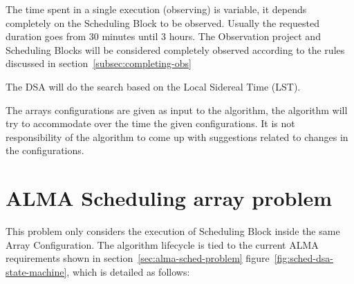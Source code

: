 The time spent in a single execution (observing) is variable, it depends completely on the Scheduling Block to be observed. Usually the requested duration goes from 30 minutes until 3 hours. The Observation project and Scheduling Blocks will be considered completely observed according to the rules discussed in section~\ref{subsec:completing-obs} 

The DSA will do the search based on the Local Sidereal Time (LST).

The arrays configurations are given as input to the algorithm, the algorithm will try to accommodate over the time the given configurations. It is not responsibility of the algorithm to come up with suggestions related to changes in the configurations.
 
\section{ALMA Scheduling array problem}

This problem only considers the execution of Scheduling Block inside the same Array Configuration. The algorithm lifecycle is tied to the current ALMA requirements shown in section~\ref{sec:alma-sched-problem} figure~\ref{fig:sched-dsa-state-machine}, which is detailed as follows:

